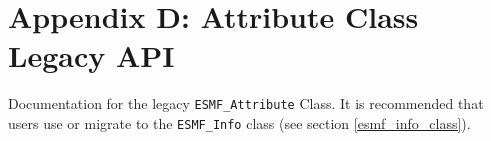 %

\section{Appendix D:  Attribute Class Legacy API}
\label{appendix_attribute_legacy_api}

Documentation for the legacy \texttt{ESMF\_Attribute} Class. It is recommended that users use or migrate to the \texttt{ESMF\_Info} class (see section \ref{esmf_info_class}).


